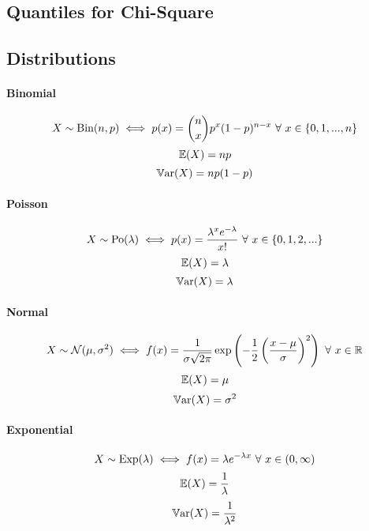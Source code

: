 \documentclass[a4paper]{article}
\begin{document}
        \newpage
        \subsection*{Quantiles for Chi-Square}
        

        \subsection*{Distributions}
            \paragraph{Binomial}
                \[
                    X \sim \text{Bin}(n, p) \iff p(x) = {n\choose x} p^x (1 -
                    p)^{n - x} \,\,\forall\,\, x \in \{0, 1, ..., n\}
                \]
                \[
                    \mathbb{E}(X) = np
                \]
                \[
                    \mathbb{V}\text{ar}(X) = np(1 - p)
                \]

            \paragraph{Poisson}
                \[
                    X \sim \text{Po}(\lambda) \iff p(x) = \frac{\lambda^x
                    e^{-\lambda}}{x!} \,\,\forall\,\, x \in \{0, 1, 2, ...\}
                \]
                \[
                    \mathbb{E}(X) = \lambda
                \]
                \[
                    \mathbb{V}\text{ar}(X) = \lambda
                \]

            \paragraph{Normal}
                \[
                    X \sim \mathcal{N}(\mu, \sigma^2) \iff f(x) =
                    \frac{1}{\sigma\sqrt{2\pi}} \exp\left(-\frac{1}{2}\left(
                    \frac{x - \mu}{\sigma}\right)^2\right) \,\,\forall\,\, x \in \mathbb{R}
                \]
                \[
                    \mathbb{E}(X) = \mu
                \]
                \[
                    \mathbb{V}\text{ar}(X) = \sigma^2
                \]

            \paragraph{Exponential}
                \[
                    X \sim \text{Exp}(\lambda) \iff f(x) = \lambda e^{-\lambda
                    x} \,\,\forall\,\, x \in (0, \infty)
                \]
                \[
                    \mathbb{E}(X) = \frac{1}{\lambda}
                \]
                \[
                    \mathbb{V}\text{ar}(X) = \frac{1}{\lambda^2}
                \]
\end{document}
